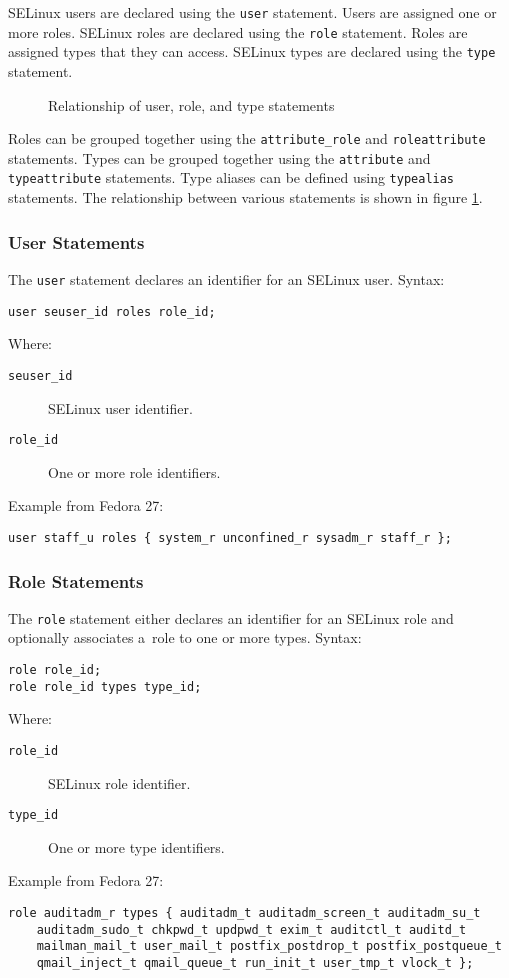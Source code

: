 SELinux users are declared using the \texttt{user} statement. Users are assigned
one or more roles. SELinux roles are declared using the \texttt{role} statement.
Roles are assigned types that they can access. SELinux types are declared using
the \texttt{type} statement.

\begin{figure}
    \centering
    \label{fig:userroletype}
    
    \caption{Relationship of user, role, and type statements}
\end{figure}

Roles can be grouped together using the \texttt{attribute\_role} and
\texttt{roleattribute} statements. Types can be grouped together using the
\texttt{attribute} and \texttt{typeattribute} statements. Type aliases can be
defined using \texttt{typealias} statements. The relationship between various
statements is shown in figure \ref{fig:userroletype}.

\subsubsection{User Statements}
The \texttt{user} statement declares an identifier for an SELinux user. Syntax:
\begin{lstlisting}[language=te]
user seuser_id roles role_id;
\end{lstlisting}
Where:
\begin{description}
    \item [\texttt{seuser\_id}] SELinux user identifier.
    \item [\texttt{role\_id}] One or more role identifiers.
\end{description}
Example from Fedora 27:
\begin{lstlisting}[language=te]
user staff_u roles { system_r unconfined_r sysadm_r staff_r };
\end{lstlisting}

\subsubsection{Role Statements}
The \texttt{role} statement either declares an identifier for an SELinux role
and optionally associates a~role to one or more types. Syntax:
\begin{lstlisting}[language=te]
role role_id;
role role_id types type_id;
\end{lstlisting}
Where:
\begin{description}
    \item [\texttt{role\_id}] SELinux role identifier.
    \item [\texttt{type\_id}] One or more type identifiers.
\end{description}
Example from Fedora 27:
\begin{lstlisting}[language=te]
role auditadm_r types { auditadm_t auditadm_screen_t auditadm_su_t
    auditadm_sudo_t chkpwd_t updpwd_t exim_t auditctl_t auditd_t
    mailman_mail_t user_mail_t postfix_postdrop_t postfix_postqueue_t
    qmail_inject_t qmail_queue_t run_init_t user_tmp_t vlock_t };
\end{lstlisting}


